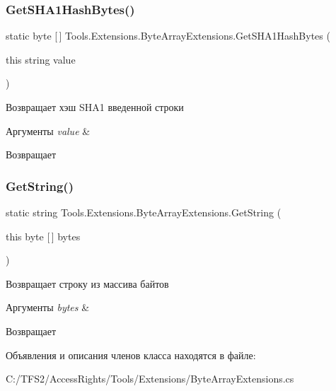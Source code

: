 \subsubsection{\texorpdfstring{Get\+S\+H\+A1\+Hash\+Bytes()}{GetSHA1HashBytes()}}
{\footnotesize\ttfamily static byte \mbox{[}$\,$\mbox{]} Tools.\+Extensions.\+Byte\+Array\+Extensions.\+Get\+S\+H\+A1\+Hash\+Bytes (\begin{DoxyParamCaption}\item[{this string}]{value }\end{DoxyParamCaption})\hspace{0.3cm}{\ttfamily [static]}}



Возвращает хэш S\+H\+A1 введенной строки 


\begin{DoxyParams}{Аргументы}
{\em value} & \\
\hline
\end{DoxyParams}
\begin{DoxyReturn}{Возвращает}

\end{DoxyReturn}
\mbox{\label{class_tools_1_1_extensions_1_1_byte_array_extensions_aace63d2cf44bcde9f64682be685ae5c4}} 
\subsubsection{\texorpdfstring{Get\+String()}{GetString()}}
{\footnotesize\ttfamily static string Tools.\+Extensions.\+Byte\+Array\+Extensions.\+Get\+String (\begin{DoxyParamCaption}\item[{this byte \mbox{[}$\,$\mbox{]}}]{bytes }\end{DoxyParamCaption})\hspace{0.3cm}{\ttfamily [static]}}



Возвращает строку из массива байтов 


\begin{DoxyParams}{Аргументы}
{\em bytes} & \\
\hline
\end{DoxyParams}
\begin{DoxyReturn}{Возвращает}

\end{DoxyReturn}


Объявления и описания членов класса находятся в файле\+:\begin{DoxyCompactItemize}
\item 
C\+:/\+T\+F\+S2/\+Access\+Rights/\+Tools/\+Extensions/Byte\+Array\+Extensions.\+cs\end{DoxyCompactItemize}
